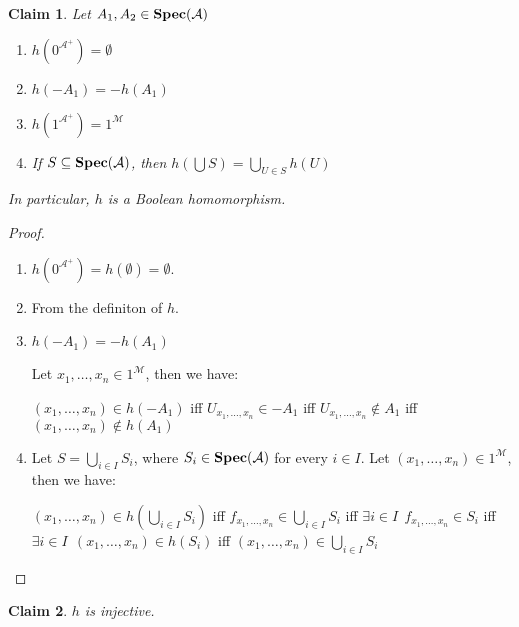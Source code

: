 \documentclass{article}
\theoremstyle{defin}
\theoremstyle{theorem}
\theoremstyle{claim}
\newtheorem{claim}{Claim}
\theoremstyle{prop}
\theoremstyle{lemma}
\theoremstyle{fact}
\theoremstyle{remark}
\theoremstyle{ex}
\theoremstyle{col}
\theoremstyle{question}
\begin{document}
\begin{claim} Let $A_1, A_2 \in {\bf Spec}(\mathcal{A})$
\begin{enumerate}
\item $h(0^{\mathcal{A}^{+}}) = \emptyset$
\item $h(- A_1) = - h(A_1)$
\item $h(1^{\mathcal{A}^{+}}) = 1^{\mathcal{M}}$
\item If $S \subseteq {\bf Spec}(\mathcal{A})$, then $h(\bigcup S) = \bigcup \limits_{U \in S} h(U)$
\end{enumerate}
In particular, $h$ is a Boolean homomorphism.
\end{claim}

\begin{proof}
$ $

\begin{enumerate}
\item $h(0^{\mathcal{A}^{+}}) = h(\emptyset) = \emptyset$.
\item From the definiton of $h$.
\item $h(- A_1) = - h(A_1)$

Let $x_1, \dots, x_n \in 1^{\mathcal{M}}$, then we have:

\begin{center}
$(x_1, \dots, x_n) \in h(- A_1)$ iff $U_{x_1, \dots, x_n} \in - A_1$ iff $U_{x_1, \dots, x_n} \notin A_1$ iff $(x_1, \dots, x_n) \notin h(A_1)$
\end{center}
\item Let $S = \bigcup \limits_{i \in I} S_i$, where $S_i \in {\bf Spec}(\mathcal{A})$ for every $i \in I$.
Let $(x_1, \dots, x_n) \in 1^{\mathcal{M}}$, then we have:
\begin{center}
$(x_1, \dots, x_n) \in h(\bigcup \limits_{i \in I} S_i)$ iff $f_{x_1, \dots, x_n} \in \bigcup \limits_{i \in I} S_i$ 
iff $\exists i \in I \:\: f_{x_1, \dots, x_n} \in S_i$ iff $\exists i \in I \:\: (x_1, \dots, x_n) \in h(S_i)$ 
iff $(x_1, \dots, x_n) \in \bigcup \limits_{i \in I} S_i$
\end{center}
\end{enumerate}
\end{proof}

\begin{claim}
$h$ is injective.
\end{claim}
\end{document}
